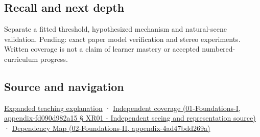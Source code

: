 \subsection{Recall and next depth}\label{recall-and-next-depth}

Separate a fitted threshold, hypothesized mechanism and natural-scene validation. Pending: exact paper model verification and stereo experiments. Written coverage is not a claim of learner mastery or accepted numbered-curriculum progress.

\subsection{Source and navigation}\label{source-and-navigation}

\href{Continuous\%20Notes/University\%20-\%20Worlds,\%20Images\%20and\%20Inference\%20-\%20Graphics,\%20Vision\%20and\%20Photography\#Binocular\%20depth\%20changes\%20the\%20optimization\%20question}{Expanded teaching explanation} · \href{}{Independent coverage (01-Foundations-I, appendix-fd090d982a15 § XR01 - Independent seeing and representation source)} · \href{}{Dependency Map (02-Foundations-II, appendix-4ad47bdd269a)}

